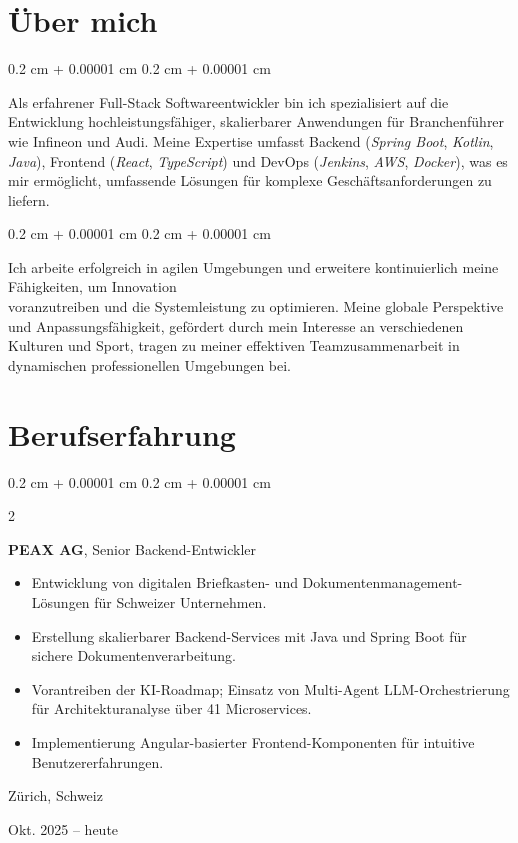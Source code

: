 \documentclass[11pt, letterpaper]{article}
\newenvironment{highlights}{
    \begin{itemize}[
        topsep=0.10 cm,
        parsep=0.10 cm,
        partopsep=0pt,
        itemsep=0pt,
        leftmargin=0.4 cm + 10pt
    ]
}{
    \end{itemize}
} %
\newenvironment{onecolentry}{
    \begin{adjustwidth}{
        0.2 cm + 0.00001 cm
    }{
        0.2 cm + 0.00001 cm
    }
}{
    \end{adjustwidth}
} %
\newenvironment{twocolentry}[2][]{
    \onecolentry
    \def\secondColumn{#2}
    \setcolumnwidth{\fill, 4.5 cm}
    \begin{paracol}{2}
}{
    \switchcolumn \raggedleft \secondColumn
    \end{paracol}
    \endonecolentry
} %
\begin{document}
    \section{Über mich}
\begin{onecolentry}
    Als erfahrener Full-Stack Softwareentwickler bin ich spezialisiert auf die Entwicklung hochleistungsfähiger, skalierbarer Anwendungen für Branchenführer wie Infineon und Audi. Meine Expertise umfasst Backend (\textit{Spring Boot}, \textit{Kotlin}, \textit{Java}), Frontend (\textit{React}, \textit{TypeScript}) und DevOps (\textit{Jenkins}, \textit{AWS}, \textit{Docker}), was es mir ermöglicht, umfassende Lösungen für komplexe Geschäftsanforderungen zu liefern.
\end{onecolentry}
\vspace{0.1 cm}
\begin{onecolentry}
    Ich arbeite erfolgreich in agilen Umgebungen und erweitere kontinuierlich meine Fähigkeiten, um Innovation \\ voranzutreiben und die Systemleistung zu optimieren. Meine globale Perspektive und Anpassungsfähigkeit, gefördert durch mein Interesse an verschiedenen Kulturen und Sport, tragen zu meiner effektiven Teamzusammenarbeit in dynamischen professionellen Umgebungen bei.
\end{onecolentry}
    
    \section{Berufserfahrung}

\begin{twocolentry}{
    Zürich, Schweiz
    
    Okt. 2025 – heute  
}
\textbf{PEAX AG}, Senior Backend-Entwickler  
\begin{highlights}  
    \item Entwicklung von digitalen Briefkasten- und Dokumentenmanagement-Lösungen für Schweizer Unternehmen.
    \item Erstellung skalierbarer Backend-Services mit Java und Spring Boot für sichere Dokumentenverarbeitung.
    \item Vorantreiben der KI-Roadmap; Einsatz von Multi-Agent LLM-Orchestrierung für Architekturanalyse über 41 Microservices.
    \item Implementierung Angular-basierter Frontend-Komponenten für intuitive Benutzererfahrungen.
\end{highlights}  
\end{twocolentry}
\end{document}
